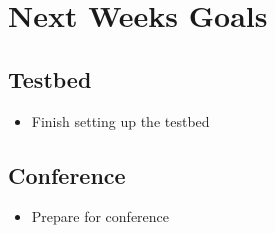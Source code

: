 \documentclass[paper=a4, fontsize=12pt]{scrartcl} %
\numberwithin{equation}{section} %
\numberwithin{figure}{section} %
\numberwithin{table}{section} %
\begin{document}
\section{Next Weeks Goals}


\subsection{Testbed}
\begin{itemize}
	\item Finish setting up the testbed
\end{itemize}

\subsection{Conference}
\begin{itemize}
	\item  Prepare for conference
\end{itemize}






\end{document}
